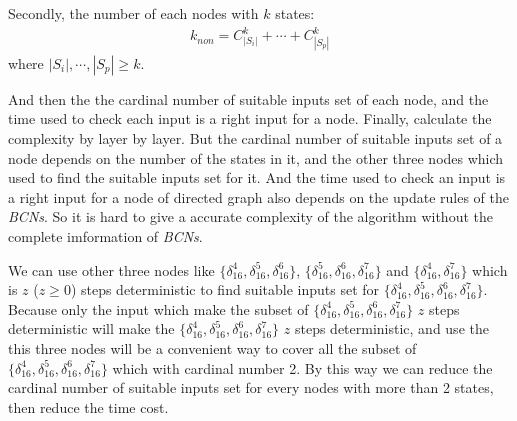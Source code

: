 Secondly, the number of each nodes with $k$ states:
\begin{equation}
\begin{split}
k_{non}= C_{|S_i|}^k+\cdots +C_{|S_p|}^k
\end{split}
\end{equation}
where $|S_i|,\cdots,|S_p|\ge k$.

And then the the cardinal number of suitable inputs set of each node, and the time used to check each input is a right input for a node. Finally, calculate the complexity by layer by layer. But the cardinal number of suitable inputs set of a node depends on the number of the states in it, and the other three nodes which used to find the suitable inputs set for it. And the time used to check an input is a right input for  a node of directed graph also depends on the update rules of the {\em BCNs}. So it is hard to give a accurate complexity of the algorithm without the complete imformation of {\em BCNs}.

We can use other three nodes like $\{\delta_{16}^4,\delta_{16}^5,\delta_{16}^6\}$, $\{\delta_{16}^5,\delta_{16}^6,\delta_{16}^7\}$ and $\{\delta_{16}^4,\delta_{16}^7\}$ which is $z$ ($z\ge0$) steps deterministic to find suitable inputs set for $\{\delta_{16}^4,\delta_{16}^5,\delta_{16}^6,\delta_{16}^7\}$. Because only the input which make the subset of $\{\delta_{16}^4,\delta_{16}^5,\delta_{16}^6,\delta_{16}^7\}$ $z$ steps deterministic will make the $\{\delta_{16}^4,\delta_{16}^5,\delta_{16}^6,\delta_{16}^7\}$ $z$ steps deterministic, and use the this three nodes will be a convenient way to cover all the subset of $\{\delta_{16}^4,\delta_{16}^5,\delta_{16}^6,\delta_{16}^7\}$ which with cardinal number 2. By this way we can  reduce the cardinal number of suitable inputs set for every nodes with more than 2 states, then reduce the time cost. 
